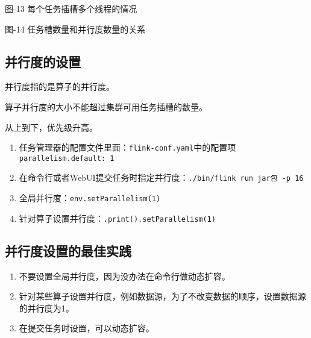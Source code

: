 图-13 每个任务插槽多个线程的情况

图-14 任务槽数量和并行度数量的关系

\hypertarget{ux5e76ux884cux5ea6ux7684ux8bbeux7f6e}{%
\subsection{并行度的设置}\label{ux5e76ux884cux5ea6ux7684ux8bbeux7f6e}}

并行度指的是算子的并行度。

算子并行度的大小不能超过集群可用任务插槽的数量。

从上到下，优先级升高。

\begin{enumerate}
\def\labelenumi{\arabic{enumi}.}
\tightlist
\item
  任务管理器的配置文件里面：\texttt{flink-conf.yaml}中的配置项\texttt{parallelism.default:\ 1}
\item
  在命令行或者WebUI提交任务时指定并行度：\texttt{./bin/flink\ run\ jar包\ -p\ 16}
\item
  全局并行度：\texttt{env.setParallelism(1)}
\item
  针对算子设置并行度：\texttt{.print().setParallelism(1)}
\end{enumerate}

\hypertarget{ux5e76ux884cux5ea6ux8bbeux7f6eux7684ux6700ux4f73ux5b9eux8df5}{%
\subsection{并行度设置的最佳实践}\label{ux5e76ux884cux5ea6ux8bbeux7f6eux7684ux6700ux4f73ux5b9eux8df5}}

\begin{enumerate}
\def\labelenumi{\arabic{enumi}.}
\tightlist
\item
  不要设置全局并行度，因为没办法在命令行做动态扩容。
\item
  针对某些算子设置并行度，例如数据源，为了不改变数据的顺序，设置数据源的并行度为1。
\item
  在提交任务时设置，可以动态扩容。
\end{enumerate}

\begin{Shaded}
\begin{Highlighting}[]
  \OperatorTok{(}\OperatorTok{)}
  \OperatorTok{(}\OperatorTok{)}
\end{Highlighting}
\end{Shaded}

